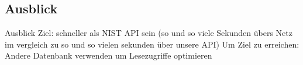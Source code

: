 \subsection{Ausblick} \label{subsec:Ausblick}
Ausblick
Ziel: schneller als NIST API sein (so und so viele Sekunden übers Netz im vergleich zu so und so vielen sekunden über unsere API)
Um Ziel zu erreichen: Andere Datenbank verwenden um Lesezugriffe optimieren